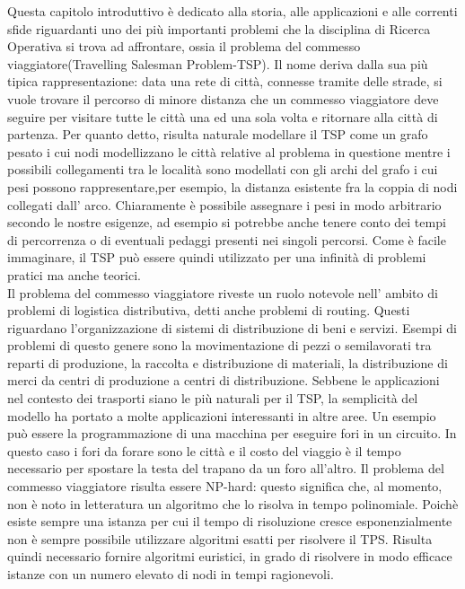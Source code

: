 \documentclass[11pt]{article}
\begin{document}
Questa capitolo introduttivo \`e dedicato alla storia, alle applicazioni e alle correnti sfide riguardanti uno dei pi\`u importanti problemi che la disciplina di Ricerca Operativa si trova ad affrontare, ossia il problema del commesso viaggiatore(Travelling Salesman Problem-TSP). 
Il nome deriva dalla sua pi\`u tipica rappresentazione: data una rete di citt\`a, connesse tramite delle strade, si vuole trovare il percorso di minore distanza che un commesso viaggiatore deve seguire per visitare tutte le citt\`a una ed una sola volta e ritornare alla citt\`a di partenza. Per quanto detto, risulta naturale modellare il TSP come un grafo pesato i cui nodi modellizzano le citt\`a relative al problema in questione mentre i possibili collegamenti tra le localit\`a sono modellati con gli archi del grafo i cui pesi possono rappresentare,per esempio, la distanza esistente fra la coppia di nodi collegati dall' arco. Chiaramente \`e possibile assegnare i pesi in modo arbitrario secondo le nostre esigenze, ad esempio si potrebbe anche tenere conto dei tempi di percorrenza o di eventuali pedaggi presenti nei singoli percorsi. Come \`e facile immaginare, il TSP pu\`o essere quindi utilizzato per una infinit\`a  di problemi pratici ma anche teorici.\\
Il problema del commesso viaggiatore riveste un ruolo notevole nell' ambito di problemi di logistica distributiva, detti anche problemi di routing. Questi riguardano l'organizzazione di sistemi di distribuzione di beni e servizi. Esempi di problemi di questo genere sono la movimentazione di pezzi o semilavorati tra reparti di produzione, la raccolta e distribuzione di materiali, la distribuzione di merci da centri di produzione a centri di distribuzione.
Sebbene le applicazioni nel contesto dei trasporti siano le pi\`u naturali per il TSP, la semplicit\`a del modello ha portato a molte applicazioni interessanti in altre aree. Un esempio pu\`o essere la programmazione di una macchina per eseguire fori in un circuito. In questo caso i fori da forare sono le citt\`a  e il costo del viaggio \`e il tempo necessario per spostare la testa del trapano da un foro all'altro. 
Il problema del commesso viaggiatore risulta essere NP-hard: questo significa che, al momento, non \`e noto in letteratura un algoritmo che lo risolva in tempo polinomiale. Poich\`e esiste sempre una istanza per cui il tempo di risoluzione cresce esponenzialmente non \`e sempre possibile utilizzare algoritmi esatti per risolvere il TPS. Risulta quindi necessario fornire algoritmi euristici, in grado di risolvere in modo efficace istanze con un numero elevato di nodi in tempi ragionevoli.
\end{document}
